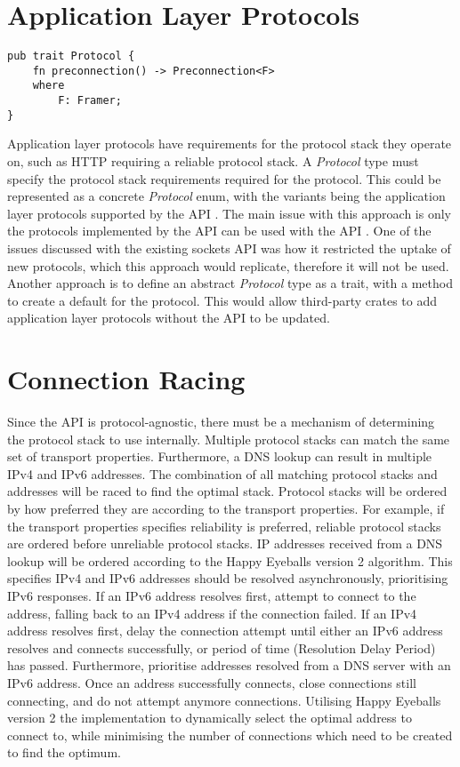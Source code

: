 \section{Application Layer Protocols}\label{sec:application-layer-protocols}
\begin{lstlisting}[float=h, label=lst:protocol, caption={The Protocol trait.}]
pub trait Protocol {
    fn preconnection() -> Preconnection<F>
    where
        F: Framer;
}
\end{lstlisting}

Application layer protocols have requirements for the protocol stack they operate on, such as HTTP requiring a reliable
protocol stack.
A \emph{Protocol} type must specify the protocol stack requirements required for the protocol.
This could be represented as a concrete \emph{Protocol} enum, with the variants being the application layer protocols
supported by the API .
The main issue with this approach is only the protocols implemented by the API can be used with the API .
One of the issues discussed with the existing sockets API was how it restricted the uptake of new protocols, which this
approach would replicate, therefore it will not be used.
Another approach is to define an abstract \emph{Protocol} type as a trait, with a method to create a default
\preconnection{} for the protocol.
This would allow third-party crates to add application layer protocols without the API to be updated.

\section{Connection Racing}\label{sec:connection-racing}
Since the API is protocol-agnostic, there must be a mechanism of determining the protocol stack to use internally.
Multiple protocol stacks can match the same set of transport properties.
Furthermore, a DNS lookup can result in multiple IPv4 and IPv6 addresses.
The combination of all matching protocol stacks and addresses will be raced to find the optimal stack.
Protocol stacks will be ordered by how preferred they are according to the transport properties.
For example, if the transport properties specifies reliability is preferred, reliable protocol stacks are ordered before
unreliable protocol stacks.
IP addresses received from a DNS lookup will be ordered according to the Happy Eyeballs version 2 algorithm.
This specifies IPv4 and IPv6 addresses should be resolved asynchronously, prioritising IPv6 responses.
If an IPv6 address resolves first, attempt to connect to the address, falling back to an IPv4 address if the connection
failed.
If an IPv4 address resolves first, delay the connection attempt until either an IPv6 address resolves and connects
successfully, or period of time (Resolution Delay Period) has passed.
Furthermore, prioritise addresses resolved from a DNS server with an IPv6 address.
Once an address successfully connects, close connections still connecting, and do not attempt anymore connections.
Utilising Happy Eyeballs version 2 the implementation to dynamically select the optimal address to connect to, while
minimising the number of connections which need to be created to find the optimum.

